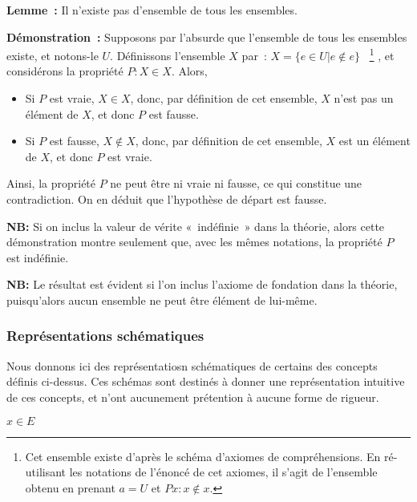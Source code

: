 \noindent\textbf{Lemme :} Il n'existe pas d'ensemble de tous les ensembles. 

\medskip

\noindent\textbf{Démonstration :} Supposons par l'absurde que l'ensemble de tous les ensembles existe, et notons-le $U$. 
Définissons l'ensemble $X$ par : $X = \lbrace e \in U \vert e \notin e \rbrace$%
~\footnote{
    Cet ensemble existe d'après le schéma d'axiomes de compréhensions. 
    En ré-utilisant les notations de l'énoncé de cet axiomes, il s'agit de l'ensemble obtenu en prenant $a = U$ et $P x: x \notin x$.
}%
, et considérons la propriété $P: X \in X$. 
Alors, 
\begin{itemize}[nosep]
    \item Si $P$ est vraie, $X \in X$, donc, par définition de cet ensemble, $X$ n'est pas un élément de $X$, et donc $P$ est fausse. 
    \item Si $P$ est fausse, $X \notin X$, donc, par définition de cet ensemble, $X$ est un élément de $X$, et donc $P$ est vraie. 
\end{itemize}
Ainsi, la propriété $P$ ne peut être ni vraie ni fausse, ce qui constitue une contradiction. 
On en déduit que l'hypothèse de départ est fausse. 

\hfill\square

\medskip

\noindent\textbf{NB:} Si on inclus la valeur de vérite « indéfinie » dans la théorie, alors cette démonstration montre seulement que, avec les mêmes notations, la propriété $P$ est indéfinie.

\medskip

\noindent\textbf{NB:} Le résultat est évident si l'on inclus l'axiome de fondation dans la théorie, puisqu'alors aucun ensemble ne peut être élément de lui-même.


\subsubsection{Représentations schématiques}

Nous donnons ici des représentatiosn schématiques de certains des concepts définis ci-dessus. 
Ces schémas sont destinés à donner une représentation intuitive de ces concepts, et n'ont aucunement prétention à aucune forme de rigueur.

\bigskip
\bigskip

\begin{minipage}{\linewidth}
\centering
{}

$x \in E$
\end{minipage}

